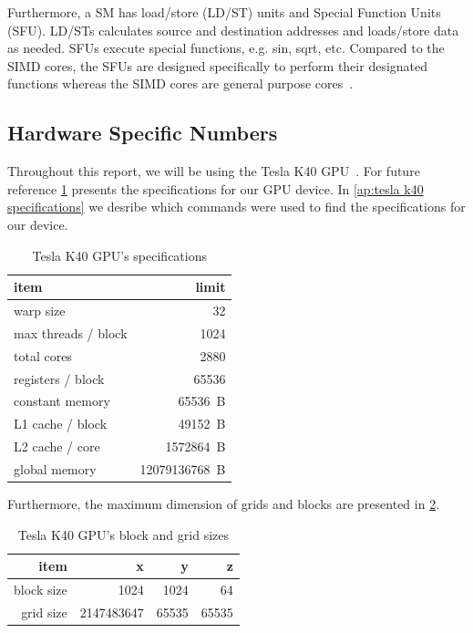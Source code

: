 Furthermore, a SM has load/store (LD/ST) units and Special Function Units (SFU).
LD/STs calculates source and destination addresses and loads/store data as needed.
SFUs execute special functions, e.g. sin, sqrt, etc.
Compared to the SIMD cores, the SFUs are designed specifically to perform their designated functions whereas the SIMD cores are general purpose cores~\cite{fermi2009nvidia}.


\subsection{Hardware Specific Numbers}
\label{sec:hardware specific numbers}

Throughout this report, we will be using the Tesla K40 GPU~\cite{teslak402013nvidia}.
For future reference \cref{tab:tesla k40 specs} presents the specifications for our GPU device.
In \cref{ap:tesla k40 specifications} we desribe which commands were used to find the specifications for our device.

\begin{table}[htb]
  \centering
  \begin{tabular}{l r}
    \toprule
    item                        & limit \\
    \midrule
    warp size                   & \SI{32}{} \\
    max threads / block         & \SI{1024}{} \\
    total cores                 & \SI{2880}{} \\
    registers / block           & \SI{65536}{} \\
    constant memory             & \SI{65536}{B} \\
    L1 cache / block            & \SI{49152}{B}  \\
    L2 cache / core             & \SI{1572864}{B}  \\
    global memory               & \SI{12079136768}{B} \\
    \bottomrule
  \end{tabular}
  \caption{Tesla K40 GPU's specifications}
  \label{tab:tesla k40 specs}
\end{table}

Furthermore, the maximum dimension of grids and blocks are presented in \cref{tab:tesla k40 grid and block}.

\begin{table}[htb]
  \centering
  \begin{tabular}{r r r r}
    \toprule
    item & x & y & z \\
    \midrule
    block size & \SI{1024}{} & \SI{1024}{} & \SI{64}{} \\
    grid size  & \SI{2147483647}{} & \SI{65535}{} & \SI{65535}{} \\
    \bottomrule
  \end{tabular}
  \caption{Tesla K40 GPU's block and grid sizes}
  \label{tab:tesla k40 grid and block}
\end{table}
